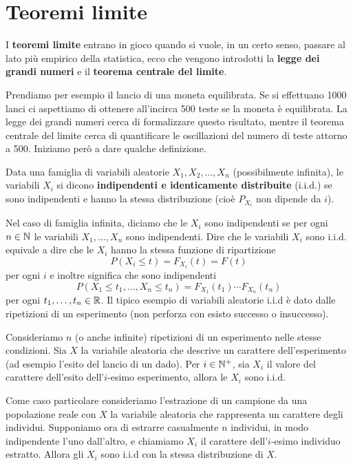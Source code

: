 \section{Teoremi limite}
I \textbf{teoremi limite} entrano in gioco quando si vuole, in un certo senso, passare al lato
più empirico della statistica, ecco che vengono introdotti la \textbf{legge dei grandi numeri} e
il \textbf{teorema centrale del limite}.

Prendiamo per esempio il lancio di una moneta equilibrata. Se si effettuano 1000 lanci ci
aspettiamo di ottenere all'incirca 500 teste se la moneta è equilibrata. La legge dei grandi numeri
cerca di formalizzare questo risultato, mentre il teorema centrale del limite cerca di quantificare
le oscillazioni del numero di teste attorno a 500. Iniziamo però a dare qualche definizione.

\begin{definition}
	Data una famiglia di variabili aleatorie $X_1, X_2, \dots, X_n$ (possibilmente infinita), le
	variabili $X_i$ si dicono \textbf{indipendenti e identicamente distribuite} (i.i.d.) se sono
	indipendenti e hanno la stessa distribuzione (cioè $P_{X_i}$ non dipende da $i$).
\end{definition}

Nel caso di famiglia infinita, diciamo che le $X_i$ sono indipendenti se per ogni $n \in \mathbb{N}$ le
variabili $X_1, \dots, X_n$ sono indipendenti. Dire che le variabili $X_i$ sono i.i.d. equivale a
dire che le $X_i$ hanno la stessa funzione di ripartizione
\[ P(X_i \leq t) = F_{X_i} (t) = F(t) \]
per ogni $i$ e inoltre significa che sono indipendenti
\[ P(X_1 \leq t_1, \dots, X_n \leq t_n) = F_{X_1} (t_1) \cdots F_{X_n} (t_n) \]
per ogni $t_1, \dots, t_n \in \mathbb{R}$. Il tipico esempio di variabili aleatorie i.i.d è dato dalle
ripetizioni di un esperimento (non perforza con esisto successo o insuccesso).

Consideriamo $n$ (o anche infinite) ripetizioni di un esperimento nelle stesse condizioni. Sia
$X$ la variabile aleatoria che descrive un carattere dell'esperimento (ad esempio l'esito del
lancio di un dado). Per $i \in \mathbb{N}^+$, sia $X_i$ il valore del carattere dell'esito dell'$i$-esimo
esperimento, allora le $X_i$ sono i.i.d.

Come caso particolare consideriamo l'estrazione di un campione da una popolazione reale con $X$ la
variabile aleatoria che rappresenta un carattere degli individui. Supponiamo ora di estrarre
casualmente $n$ individui, in modo indipendente l'uno dall'altro, e chiamiamo $X_i$ il carattere
dell'$i$-esimo individuo estratto. Allora gli $X_i$ sono i.i.d con la stessa distribuzione di $X$.

